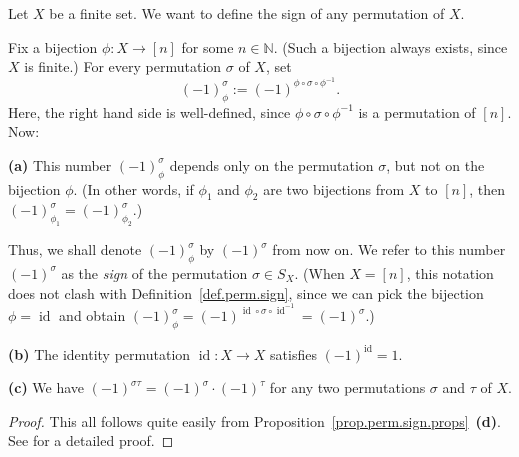 \begin{proposition}
\label{prop.perm.sign.X}
\leantarget
\leanok
Let $X$ be a finite set. We want to define the sign of any permutation of $X$.

Fix a bijection $\phi : X \to [n]$ for some $n \in \mathbb{N}$. (Such a
bijection always exists, since $X$ is finite.) For every permutation
$\sigma$ of $X$, set
\[
(-1)_{\phi}^{\sigma} := (-1)^{\phi \circ \sigma \circ \phi^{-1}}.
\]
Here, the right hand side is well-defined, since
$\phi \circ \sigma \circ \phi^{-1}$ is a permutation of $[n]$. Now:

\textbf{(a)} This number $(-1)_{\phi}^{\sigma}$ depends only on the
permutation $\sigma$, but not on the bijection $\phi$. (In other words,
if $\phi_1$ and $\phi_2$ are two bijections from $X$ to $[n]$, then
$(-1)_{\phi_1}^{\sigma} = (-1)_{\phi_2}^{\sigma}$.)

Thus, we shall denote $(-1)_{\phi}^{\sigma}$ by $(-1)^{\sigma}$ from
now on. We refer to this number $(-1)^{\sigma}$ as the \emph{sign} of the
permutation $\sigma \in S_X$. (When $X = [n]$, this notation does not
clash with Definition~\ref{def.perm.sign}, since we can pick the bijection
$\phi = \operatorname{id}$ and obtain
$(-1)_{\phi}^{\sigma} = (-1)^{\operatorname{id} \circ \sigma \circ
\operatorname{id}^{-1}} = (-1)^{\sigma}$.)

\textbf{(b)} The identity permutation $\operatorname{id} : X \to X$
satisfies $(-1)^{\operatorname{id}} = 1$.

\textbf{(c)} We have $(-1)^{\sigma\tau} = (-1)^{\sigma} \cdot (-1)^{\tau}$
for any two permutations $\sigma$ and $\tau$ of $X$.
\end{proposition}

\begin{proof}
This all follows quite easily from
Proposition~\ref{prop.perm.sign.props}~\textbf{(d)}. See
\cite[Exercise 5.12]{detnotes} for a detailed proof.
\end{proof}
